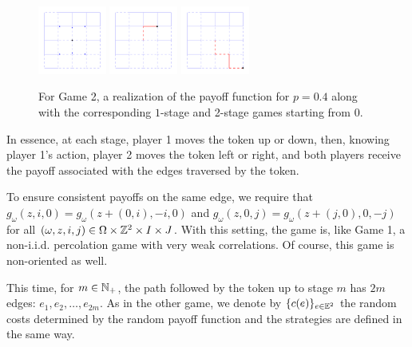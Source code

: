         \begin{figure}[H]
            \centering
            \includegraphics[width = 0.2\textwidth]{../images/game2/L5grid_arrowsit0p040.png}    
            \includegraphics[width = 0.2\textwidth]{../images/game2/Ll1opit1p040.png}            
            \includegraphics[width = 0.2\textwidth]{../images/game2/Ll2opit2p040.png}
            \caption{For Game 2, a realization of the payoff function for $p = 0.4$ along with the corresponding $1$-stage and 2-stage games starting from 0.}
        \end{figure}

        In essence, at each stage, player 1 moves the token up or down, then, knowing player 1's action, player 2 moves the token left or right, and both players receive the payoff associated with the edges traversed by the token.

        To ensure consistent payoffs on the same edge, we require that $g_{\omega}(z, i, 0) = g_{\omega}(z + (0, i), -i, 0)$ and $g_{\omega}(z, 0, j) = g_{\omega}(z + (j, 0), 0, -j)$ for all $(\omega, z, i, j) \in \Omega \times \mathbb{Z}^2 \times I \times J$. With this setting, the game is, like Game 1, a non-i.i.d. percolation game with very weak correlations. Of course, this game is non-oriented as well. 

        This time, for $m \in \mathbb{N}_+$, the path followed by the token up to stage $m$ has $2m$ edges:  $e_1, e_2, \ldots, e_{2m}$. As in the other game, we denote by $\{c(e)\}_{e \in \mathbb{E}^2}$ the random costs determined by the random payoff function and the strategies are defined in the same way. 

